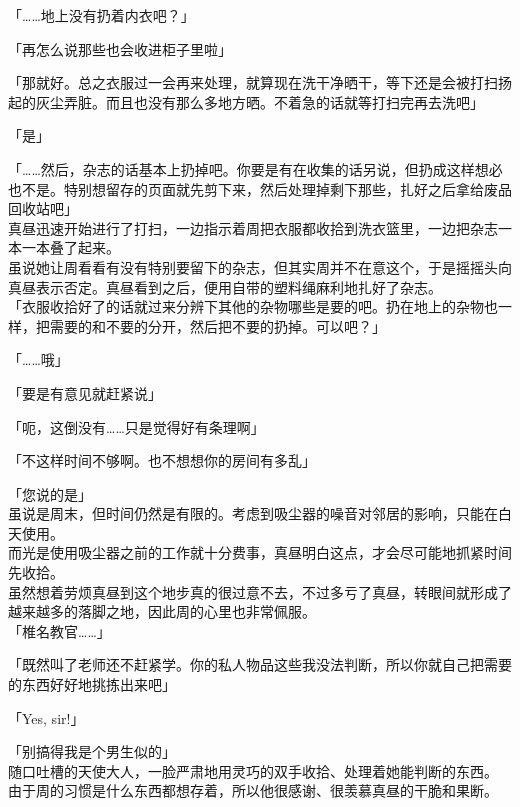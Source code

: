 「……地上没有扔着内衣吧？」

「再怎么说那些也会收进柜子里啦」

「那就好。总之衣服过一会再来处理，就算现在洗干净晒干，等下还是会被打扫扬起的灰尘弄脏。而且也没有那么多地方晒。不着急的话就等打扫完再去洗吧」

「是」

「……然后，杂志的话基本上扔掉吧。你要是有在收集的话另说，但扔成这样想必也不是。特别想留存的页面就先剪下来，然后处理掉剩下那些，扎好之后拿给废品回收站吧」\\

真昼迅速开始进行了打扫，一边指示着周把衣服都收拾到洗衣篮里，一边把杂志一本一本叠了起来。\\

虽说她让周看看有没有特别要留下的杂志，但其实周并不在意这个，于是摇摇头向真昼表示否定。真昼看到之后，便用自带的塑料绳麻利地扎好了杂志。\\

「衣服收拾好了的话就过来分辨下其他的杂物哪些是要的吧。扔在地上的杂物也一样，把需要的和不要的分开，然后把不要的扔掉。可以吧？」

「……哦」

「要是有意见就赶紧说」

「呃，这倒没有……只是觉得好有条理啊」

「不这样时间不够啊。也不想想你的房间有多乱」

「您说的是」\\

虽说是周末，但时间仍然是有限的。考虑到吸尘器的噪音对邻居的影响，只能在白天使用。\\

而光是使用吸尘器之前的工作就十分费事，真昼明白这点，才会尽可能地抓紧时间先收拾。\\

虽然想着劳烦真昼到这个地步真的很过意不去，不过多亏了真昼，转眼间就形成了越来越多的落脚之地，因此周的心里也非常佩服。\\

「椎名教官……」

「既然叫了老师还不赶紧学。你的私人物品这些我没法判断，所以你就自己把需要的东西好好地挑拣出来吧」

「Yes, sir!」

「别搞得我是个男生似的」\\

随口吐槽的天使大人，一脸严肃地用灵巧的双手收拾、处理着她能判断的东西。\\

由于周的习惯是什么东西都想存着，所以他很感谢、很羡慕真昼的干脆和果断。\\


